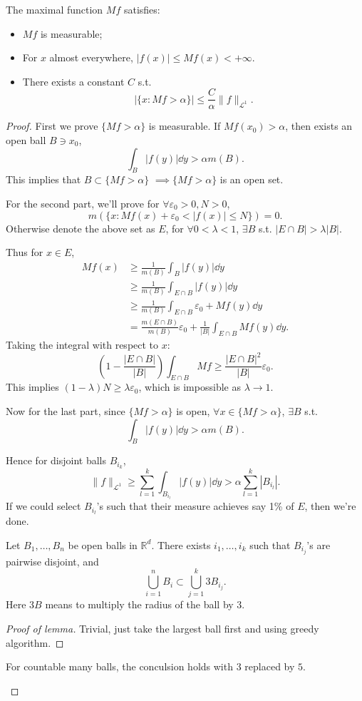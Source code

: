 \begin{theorem}
    The maximal function $Mf$ satisfies:
	\begin{itemize}
		\item $Mf$ is measurable;
		\item For  $x$ almost everywhere,  $|f(x)|\le Mf(x)<+\infty$.

		\item There exists a constant $C$ s.t.
			\[
			\left|\{x: Mf> \alpha\}\right| \le
			\frac{C}{\alpha}\lVert f \rVert _{\mathcal{L}^1}.
			\]
	\end{itemize}
\end{theorem}
\begin{proof}[Proof]
    First we prove $\{Mf>\alpha\}$ is measurable.
	If $Mf(x_0)>\alpha$, then exists an open ball $B\ni x_0$,
	\[
	\int_B |f(y)|\dd y > \alpha m(B).
	\]
	This implies that $B \subset \{Mf>\alpha\}$
	$ \implies \{Mf>\alpha\}$ is an open set.

	For the second part, we'll prove for $\forall \varepsilon_0>0, N>0$,
	\[
	m(\{x: Mf(x)+ \varepsilon_0<|f(x)|\le N\}) = 0.
	\]
	Otherwise denote the above set as $E$,
	for  $\forall 0<\lambda<1$,  $\exists B$
	s.t. $|E\cap B|>\lambda |B|$.

	Thus for $x\in E$,
	\begin{align*}
		Mf(x) &\ge \frac{1}{m(B)}\int_B |f(y)|\dd y\\
		&\ge \frac{1}{m(B)}\int _{E\cap B}|f(y)|\dd y\\
		&\ge \frac{1}{m(B)}\int_{E\cap B} \varepsilon_0+Mf(y)\dd y\\
		&= \frac{m(E\cap B)}{m(B)}\varepsilon_0
		+ \frac{1}{|B|}\int _{E\cap B} Mf(y)\dd y.
	\end{align*}
	Taking the integral with respect to $x$:
	\[
	\left( 1-\frac{|E\cap B|}{|B|} \right)\int_{E\cap B} Mf
	\ge \frac{|E\cap B|^2}{|B|}\varepsilon_0.
	\]
	This implies $(1-\lambda)N \ge \lambda\varepsilon_0$, which is impossible
	as $\lambda\to 1$.

	Now for the last part, since $\{Mf>\alpha\}$ is open,
	$\forall x\in \{Mf>\alpha\}$, $\exists B$ s.t.
	\[
	\int_B |f(y)|\dd y >\alpha m(B).
	\]

	Hence for disjoint balls $B_{i_k}$,
	\[
	\lVert f \rVert _{\mathcal{L}^1}\ge
	\sum_{l=1}^k \int_{B_{i_l}}|f(y)|\dd y > \alpha\sum_{l=1}^k |B_{i_l}|.
	\]
	If we could select $B_{i_l}$'s such that their measure achieves
	say 1\% of $E$, then we're done.

	\begin{lemma}
		Let $B_1,\dots,B_n$ be open balls in $\mathbb{R}^d$.
		There exists $i_1,\dots,i_k$ such that $B_{i_j}$'s are
		pairwise disjoint, and
		\[
		\bigcup_{i=1}^n B_i \subset \bigcup_{j=1}^k 3B_{i_j}.
		\]
		Here $3B$ means to multiply the radius of the ball by 3.
	\end{lemma}
	\begin{proof}[Proof of lemma]
		Trivial, just take the largest ball first and using greedy algorithm.
	\end{proof}
	\begin{remark}
		For countable many balls, the conculsion holds with $3$ replaced by $5$.
	\end{remark}


\end{proof}
